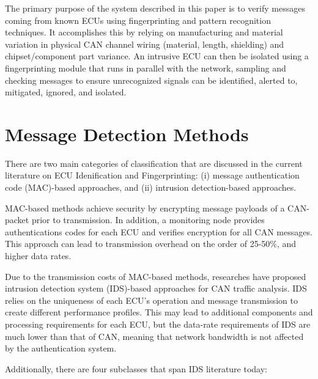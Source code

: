 \documentclass[conference]{IEEEtran}
\begin{document}
The primary purpose of the system described in this paper is to verify messages coming from known ECUs using fingerprinting and pattern recognition techniques. It accomplishes this by relying on manufacturing and material variation in physical CAN channel wiring (material, length, shielding) and chipset/component part variance. An intrusive ECU can then be isolated using a fingerprinting module that runs in parallel with the network, sampling and checking messages to ensure unrecognized signals can be identified, alerted to, mitigated, ignored, and isolated.


\section{Message Detection Methods} \label{sec:MDM}
There are two main categories of classification that are discussed in the current literature on ECU Idenification and Fingerprinting: (i) message authentication code (MAC)-based approaches, and (ii) intrusion detection-based approaches.

MAC-based methods achieve security by encrypting message payloads of a CAN-packet prior to transmission. In addition, a monitoring node provides authentications codes for each ECU and verifies encryption for all CAN messages. This approach can lead to transmission overhead on the order of 25-50\%, and higher data rates.

Due to the transmission costs of MAC-based methods, researches have proposed intrusion detection system (IDS)-based approaches for CAN traffic analysis. IDS relies on the uniqueness of each ECU's operation and message transmission to create different performance profiles. This may lead to additional components and processing requirements for each ECU, but the data-rate requirements of IDS are much lower than that of CAN, meaning that network bandwidth is not affected by the authentication system.

Additionally, there are four subclasses that span IDS literature today:
\end{document}
